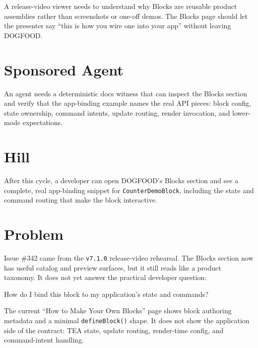 A release-video viewer needs to understand why Blocks are reusable product assemblies rather than screenshots or one-off demos. The Blocks page should let the presenter say ``this is how you wire one into your app'' without leaving DOGFOOD.

\section{Sponsored Agent}\label{record-143-sponsored-agent}

An agent needs a deterministic docs witness that can inspect the Blocks section and verify that the app-binding example names the real API pieces: block config, state ownership, command intents, update routing, render invocation, and lower-mode expectations.

\section{Hill}\label{record-143-hill}

After this cycle, a developer can open DOGFOOD's Blocks section and see a complete, real app-binding snippet for \texttt{C\allowbreak{}o\allowbreak{}u\allowbreak{}n\allowbreak{}t\allowbreak{}e\allowbreak{}r\allowbreak{}D\allowbreak{}e\allowbreak{}m\allowbreak{}o\allowbreak{}B\allowbreak{}l\allowbreak{}o\allowbreak{}c\allowbreak{}k}, including the state and command routing that make the block interactive.

\section{Problem}\label{record-143-problem}

Issue \#342 came from the \texttt{v\allowbreak{}7\allowbreak{}.\allowbreak{}1\allowbreak{}.\allowbreak{}0} release-video rehearsal. The Blocks section now has useful catalog and preview surfaces, but it still reads like a product taxonomy. It does not yet answer the practical developer question:

\begin{CodeBlock}
How do I bind this block to my application's state and commands?
\end{CodeBlock}

The current ``How to Make Your Own Blocks'' page shows block authoring metadata and a minimal \texttt{d\allowbreak{}e\allowbreak{}f\allowbreak{}i\allowbreak{}n\allowbreak{}e\allowbreak{}B\allowbreak{}l\allowbreak{}o\allowbreak{}c\allowbreak{}k\allowbreak{}(\allowbreak{})} shape. It does not show the application side of the contract: TEA state, update routing, render-time config, and command-intent handling.

